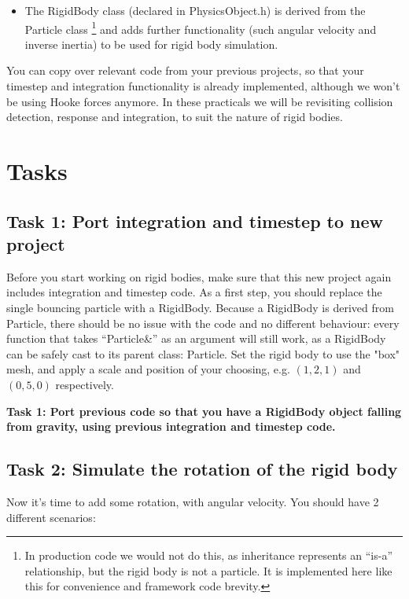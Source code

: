 \documentclass[12pt]{article}
\begin{document}
\begin{itemize}
\item The RigidBody class (declared in PhysicsObject.h) is derived from the Particle class \footnote{In production code we would not do this, as inheritance represents an ``is-a'' relationship, but the rigid body is not a particle. It is implemented here like this for convenience and framework code brevity.} and adds further functionality (such angular velocity and inverse inertia) to be used for rigid body simulation. 
\end{itemize}

You can copy over relevant code from your previous projects, so that your timestep and integration functionality is already implemented, although we won't be using Hooke forces anymore. In these practicals we will be revisiting collision detection, response and integration, to suit the nature of rigid bodies.

\section*{Tasks}

\subsection*{Task 1: Port integration and timestep to new project}

Before you start working on rigid bodies, make sure that this new project again includes integration and timestep code. As a first step, you should replace the single bouncing particle with a RigidBody. Because a RigidBody is derived from Particle, there should be no issue with the code and no different behaviour: every function that takes ``Particle\&'' as an argument will still work, as a RigidBody can be safely cast to its parent class: Particle. Set the rigid body to use the "box" mesh, and apply a scale and position of your choosing, e.g. $(1,2,1)$ and $(0,5,0)$ respectively. 

\textbf{Task 1: Port previous code so that you have a RigidBody object falling from gravity, using previous integration and timestep code.}

\subsection*{Task 2: Simulate the rotation of the rigid body}

Now it's time to add some rotation, with angular velocity. You should have 2 different scenarios:
\end{document}
